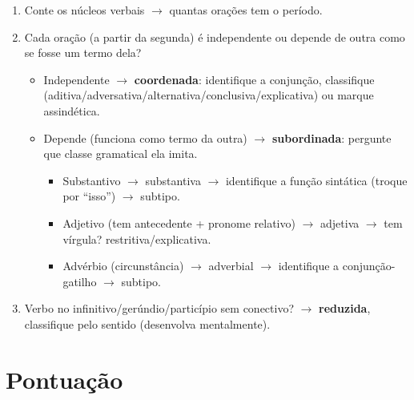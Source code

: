 \begin{regrapratica}
\begin{enumerate}
\item Conte os núcleos verbais $\to$ quantas orações tem o período.
\item Cada oração (a partir da segunda) é independente ou depende de outra
como se fosse um termo dela?
\begin{itemize}
\item Independente $\to$ \textbf{coordenada}: identifique a conjunção,
classifique (aditiva/adversativa/alternativa/conclusiva/explicativa) ou
marque assindética.
\item Depende (funciona como termo da outra) $\to$ \textbf{subordinada}:
pergunte que classe gramatical ela imita.
\begin{itemize}
\item Substantivo $\to$ substantiva $\to$ identifique a função sintática
(troque por “isso”) $\to$ subtipo.
\item Adjetivo (tem antecedente + pronome relativo) $\to$ adjetiva $\to$ tem
vírgula? restritiva/explicativa.
\item Advérbio (circunstância) $\to$ adverbial $\to$ identifique a
conjunção-gatilho $\to$ subtipo.
\end{itemize}
\end{itemize}
\item Verbo no infinitivo/gerúndio/particípio sem conectivo? $\to$
\textbf{reduzida}, classifique pelo sentido (desenvolva mentalmente).
\end{enumerate}
\end{regrapratica}

\section{Pontuação}

